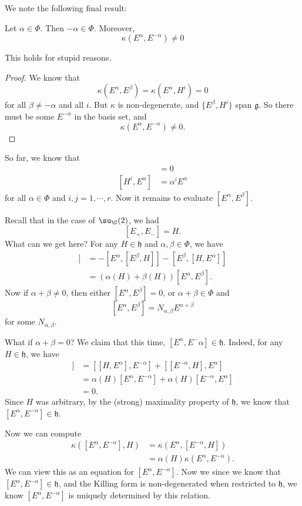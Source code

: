 \documentclass[a4paper]{article}
\begin{document}
We note the following final result:
\begin{lemma}
  Let $\alpha \in \Phi$. Then $-\alpha \in \Phi$. Moreover,
  \[
    \kappa(E^\alpha, E^{-\alpha}) \not= 0
  \]
\end{lemma}
This holds for stupid reasons.

\begin{proof}
  We know that
  \[
    \kappa(E^\alpha, E^\beta) = \kappa(E^\alpha, H^i) = 0
  \]
  for all $\beta \not= -\alpha$ and all $i$. But $\kappa$ is non-degenerate, and $\{E^\beta, H^i\}$ span $\mathfrak{g}$. So there must be some $E^{-\alpha}$ in the basis set, and
  \[
    \kappa(E^\alpha, E^{-\alpha}) \not= 0.
  \]
\end{proof}

So far, we know that
\begin{align*}
  [H^i, H^j] &= 0\\
  [H^i, E^\alpha] &= \alpha^i E^\alpha
\end{align*}
for all $\alpha \in \Phi$ and $i, j = 1, \cdots, r$. Now it remains to evaluate $[E^\alpha, E^\beta]$.

Recall that in the case of $\su_\C(2)$, we had
\[
  [E_+, E_-] = H.
\]
What can we get here? For any $H \in \mathfrak{h}$ and $\alpha, \beta \in \Phi$, we have
\begin{align*}
  [H, [E^\alpha, E^\beta]] &= -[E^\alpha, [E^\beta, H]] - [E^\beta, [H, E^\alpha]]\\
  &= (\alpha(H)+ \beta(H))[E^\alpha, E^\beta].
\end{align*}
Now if $\alpha + \beta \not= 0$, then either $[E^\alpha, E^\beta] = 0$, or $\alpha + \beta \in \Phi$ and
\[
  [E^\alpha, E^\beta] = N_{\alpha, \beta} E^{\alpha + \beta}
\]
for some $N_{\alpha, \beta}$.

What if $\alpha + \beta = 0$? We claim that this time, $[E^\alpha, E^-\alpha] \in \mathfrak{h}$. Indeed, for any $H \in \mathfrak{h}$, we have
\begin{align*}
  [H, [E^\alpha, E^{-\alpha}]] &= [[H, E^\alpha], E^{-\alpha}] + [[E^{-\alpha}, H], E^\alpha]\\
  &= \alpha(H) [E^\alpha, E^{-\alpha}] + \alpha(H) [E^{-\alpha}, E^\alpha]\\
  &= 0.
\end{align*}
Since $H$ was arbitrary, by the (strong) maximality property of $\mathfrak{h}$, we know that $[E^\alpha, E^{-\alpha}] \in \mathfrak{h}$.

Now we can compute
\begin{align*}
  \kappa([E^\alpha, E^{-\alpha}], H) &= \kappa(E^\alpha, [E^{-\alpha}, H])\\
  &= \alpha(H) \kappa(E^\alpha, E^{-\alpha}).
\end{align*}
We can view this as an equation for $[E^\alpha, E^{-\alpha}]$. Now we since we know that $[E^\alpha, E^{-\alpha}] \in \mathfrak{h}$, and the Killing form is non-degenerated when restricted to $\mathfrak{h}$, we know $[E^\alpha, E^{-\alpha}]$ is uniquely determined by this relation.
\end{document}
